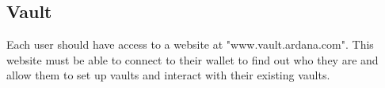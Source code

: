 \documentclass{article} %
\begin{document}
% 
% 
% 
% 
\subsection{Vault}

Each user should have access to a website at "www.vault.ardana.com".
This website must be able to connect to their wallet to find out who they are
and allow them to set up vaults and interact with their existing vaults.
\end{document}
